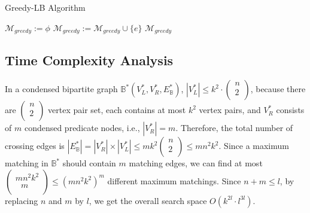 \begin{algorithm} [t]
	\caption{Greedy-LB Algorithm} \label{alg:greedy_lb}
	$\mathcal{M}_{greedy} := \phi$ \;
	{
		{
			$\mathcal{M}_{greedy} := \mathcal{M}_{greedy} \cup \{e\}$
		}
		\Return $\mathcal{M}_{greedy}$ \;
	}
\end{algorithm}

\vspace{-0.1in}
\subsection{Time Complexity Analysis} 
In a condensed bipartite graph $\mathbb{B}^{*}(V_{L}^*,V_{R}^*,E_{\mathbb{B}}^*)$, $|V_L^*| \le k^2 \cdot \left( \begin{array}{l}  n \\  2 \\  \end{array} \right)$, because there are $\left( \begin{array}{l}  n \\  2 \\  \end{array} \right)$ vertex pair set, each contains at most $k^2$ vertex pairs, and $V_R^*$ consists of $m$ condensed predicate nodes, i.e., $|V_R^*|=m$. Therefore, the total number of crossing edges is $|E_{\mathbb{B}}^*|=|V_R^*|\times|V_L^*| \le mk^2\left( \begin{array}{l}  n \\  2 \\  \end{array} \right) \le mn^2k^2$. Since a maximum matching in $\mathbb{B}^{*}$ should contain $m$ matching edges, we can find at most $\left( \begin{array}{l}  mn^2k^2 \\  \ \ \ m \\  \end{array} \right) \le (mn^2k^2)^m$ different maximum matchings. Since $n+m \le l$, by replacing $n$ and $m$ by $l$, we get the overall search space $O(k^{2l} \cdot l^{3l})$.


